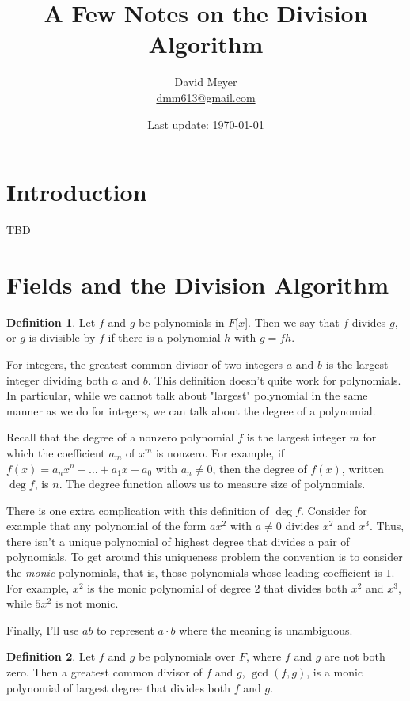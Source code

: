 \documentclass{article}
\title{A Few Notes on the Division Algorithm}
\author{David Meyer \\ \href{mailto:dmm613@gmail.com}
                            {dmm613@gmail.com}}
\date{Last update: \today}
\theoremstyle{definition}
\newtheorem{definition}{Definition}[section]
\begin{document}
\maketitle
%
%
%
\section{Introduction}
\label{sec:introduction}

TBD

\section{Fields and the Division Algorithm}

\begin{definition}
Let $f$ and $g$ be polynomials in $F[x$]. Then we say that $f$
divides $g$, or $g$ is divisible by $f$ if there is a polynomial
$h$ with $g = fh$.
\end{definition}

\noindent
For integers, the greatest common divisor of two integers $a$ and
$b$ is the largest integer dividing both $a$ and $b$. This
definition doesn't quite work for polynomials. In particular,
while we cannot talk about "largest" polynomial in the same
manner as we do for integers, we can talk about the degree of a
polynomial.

\bigskip
\noindent
Recall that the degree of a nonzero polynomial $f$ is the largest
integer $m$ for which the coefficient $a_m$ of $x^m$ is
nonzero. For example, if $f(x) = a_nx^n + \hdots + a_1x+a_0$ with
$a_n \neq 0$, then the degree of $f(x)$, written $\deg f$, is
$n$. The degree function allows us to measure size of
polynomials.

\bigskip
\noindent
There is one extra complication with this definition of $\deg
f$. Consider for example that any polynomial of the form $ax^2$
with $a \neq 0$ divides $x^2$ and $x^3$. Thus, there isn't a
unique polynomial of highest degree that divides a pair of
polynomials. To get around this uniqueness problem the convention
is to consider the \emph{monic} polynomials, that is, those
polynomials whose leading coefficient is $1$. For example, $x^2$
is the monic polynomial of degree $2$ that divides both $x^2$ and
$x^3$, while $5x^2$ is not monic.

\bigskip
\noindent
Finally, I'll use $ab$ to represent $a \cdot b$ where the meaning
is unambiguous.


\begin{definition}
Let $f$ and $g$ be polynomials over $F$, where $f$ and $g$ are
not both zero. Then a greatest common divisor of $f$ and $g$,
$\gcd(f,g)$, is a monic polynomial of largest degree that divides
both $f$ and $g$.
\label{def:gcd}
\end{definition}
\end{document}

